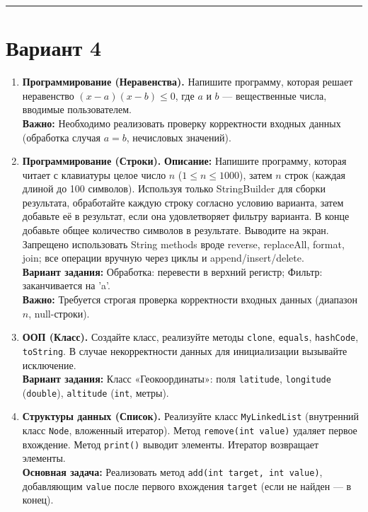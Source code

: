 \documentclass[10pt,a4paper]{article}
\begin{document}
\vspace{1cm}
\hrule
\vspace{1cm}

\section*{Вариант 4}

\begin{enumerate}
    \item \textbf{Программирование (Неравенства).} Напишите программу, которая решает неравенство $(x - a)(x - b) \leqslant 0$, где $a$ и $b$ — вещественные числа, вводимые пользователем. \\
    \textbf{Важно:} Необходимо реализовать проверку корректности входных данных (обработка случая $a = b$, нечисловых значений).
    
    \item \textbf{Программирование (Строки).} \textbf{Описание:} Напишите программу, которая читает с клавиатуры целое число $n$ ($1 \leq n \leq 1000$), затем $n$ строк (каждая длиной до 100 символов). Используя только StringBuilder для сборки результата, обработайте каждую строку согласно условию варианта, затем добавьте её в результат, если она удовлетворяет фильтру варианта. В конце добавьте общее количество символов в результате. Выводите на экран. Запрещено использовать String methods вроде reverse, replaceAll, format, join; все операции вручную через циклы и append/insert/delete. \\
    \textbf{Вариант задания:} Обработка: перевести в верхний регистр; Фильтр: заканчивается на 'a'. \\
    \textbf{Важно:} Требуется строгая проверка корректности входных данных (диапазон $n$, null-строки).
    
    \item \textbf{ООП (Класс).} Создайте класс, реализуйте методы \texttt{clone}, \texttt{equals}, \texttt{hashCode}, \texttt{toString}. В случае некорректности данных для инициализации вызывайте исключение. \\
    \textbf{Вариант задания:} Класс «Геокоординаты»: поля \texttt{latitude}, \texttt{longitude} (\texttt{double}), \texttt{altitude} (\texttt{int}, метры).
    
    \item \textbf{Структуры данных (Список).} Реализуйте класс \texttt{MyLinkedList} (внутренний класс \texttt{Node}, вложенный итератор). Метод \texttt{remove(int value)} удаляет первое вхождение. Метод \texttt{print()} выводит элементы. Итератор возвращает элементы. \\
    \textbf{Основная задача:} Реализовать метод \texttt{add(int target, int value)}, добавляющим \texttt{value} после первого вхождения \texttt{target} (если не найден — в конец).
\end{enumerate}
\end{document}
